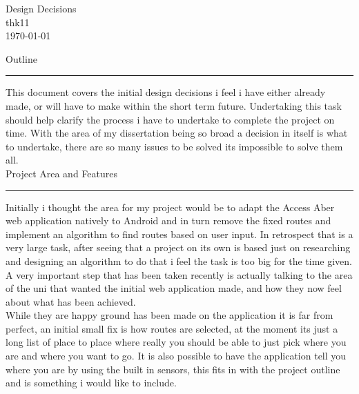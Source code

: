 \documentclass[10pt,a4paper]{article}
\begin{document}
\begin{center}


\Huge Design Decisions\\
\Large thk11\\
\today




\end{center}
\noindent
\large Outline\\
\normalsize
\hrule
\vspace{0.2cm}
\noindent
This document covers the initial design decisions i feel i have either already made, or will have to make within the short term future. Undertaking this task should help clarify the process i have to undertake to complete the project on time. With the area of my dissertation being so broad a decision in itself is what to undertake, there are so many issues to be solved its impossible to solve them all. \\

\noindent
\large Project Area and Features\\
\hrule
\vspace{0.2cm}
\noindent
Initially i thought the area for my project would be to adapt the Access Aber web application natively to Android and in turn remove the fixed routes and implement an algorithm to find routes based on user input. In retrospect that is a very large task, after seeing that a project on its own is based just on researching and designing an algorithm to do that i feel the task is too big for the time given. A very important step that has been taken recently is actually talking to the area of the uni that wanted the initial web application made, and how they now feel about what has been achieved.\\

\noindent
While they are happy ground has been made on the application it is far from perfect, an initial small fix is how routes are selected, at the moment its just a long list of place to place where really you should be able to just pick where you are and where you want to go. It is also possible to have the application tell you where you are by using the built in sensors, this fits in with the project outline and is something i would like to include.  \\
\end{document}
